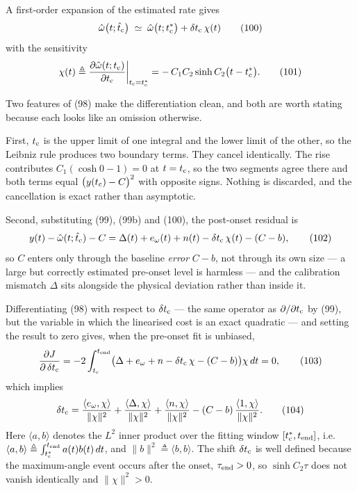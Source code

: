 \documentclass[10pt]{article}
\newcommand{\tc}{t_{\rm c}}
\newcommand{\tcs}{t_{\rm c}^{*}}
\newcommand{\tend}{t_{\rm end}}
\begin{document}
A first-order expansion of the estimated rate gives
\begin{equation}
  \hat\omega\bigl(t;\hat\tc\bigr)
  \;\simeq\; \hat\omega\bigl(t;\tcs\bigr) + \delta\tc\,\chi(t)
  \tag{100}
\end{equation}
with the sensitivity
\begin{equation}
  \chi(t) \triangleq
  \frac{\partial\hat\omega(t;\tc)}{\partial \tc}\bigg|_{\tc = \tcs}
  = -\,C_1C_2\sinh C_2\bigl(t - \tcs\bigr).
  \tag{101}
\end{equation}

Two features of (98) make the differentiation clean, and both are worth
stating because each looks like an omission otherwise.

First, $\tc$ is the upper limit of one integral and the lower limit of
the other, so the Leibniz rule produces two boundary terms. They cancel
identically. The rise contributes $C_1(\cosh 0 - 1) = 0$ at $t = \tc$,
so the two segments agree there and both terms equal
$\bigl(y(\tc) - C\bigr)^2$ with opposite signs. Nothing is discarded,
and the cancellation is exact rather than asymptotic.

Second, substituting (99), (99b) and (100), the post-onset residual is
\begin{equation}
  y(t) - \hat\omega(t;\hat\tc) - C
  = \Delta(t) + e_\omega(t) + n(t) - \delta\tc\,\chi(t) - (C - b),
  \tag{102}
\end{equation}
so $C$ enters only through the baseline \emph{error} $C - b$, not
through its own size --- a large but correctly estimated pre-onset level
is harmless --- and the calibration mismatch $\Delta$ sits alongside the
physical deviation rather than inside it.

Differentiating (98) with respect to $\delta\tc$ --- the same operator
as $\partial/\partial\tc$ by (99), but the variable in which the
linearised cost is an exact quadratic --- and setting the result to zero
gives, when the pre-onset fit is unbiased,
\begin{equation}
  \frac{\partial J}{\partial\,\delta\tc}
  = -2\int_{\tc}^{\tend}\bigl(\Delta + e_\omega + n
      - \delta\tc\,\chi - (C-b)\bigr)\chi\,dt = 0 ,
  \tag{103}
\end{equation}
which implies
\begin{equation}
  \delta\tc
  = \frac{\langle e_\omega,\chi\rangle}{\|\chi\|^{2}}
  + \frac{\langle \Delta,\chi\rangle}{\|\chi\|^{2}}
  + \frac{\langle n,\chi\rangle}{\|\chi\|^{2}}
  - (C - b)\,\frac{\langle 1,\chi\rangle}{\|\chi\|^{2}} .
  \tag{104}
\end{equation}
Here $\langle a,b\rangle$ denotes the $L^2$ inner product over the
fitting window $[\tcs,\tend]$, i.e.\ $\langle a,b\rangle \triangleq
\int_{\tcs}^{\tend}a(t)b(t)\,dt$, and $\|b\|^2 \triangleq \langle
b,b\rangle$. The shift $\delta\tc$ is well defined because the
maximum-angle event occurs after the onset, $\tau_{\rm end} > 0$, so
$\sinh C_2\tau$ does not vanish identically and $\|\chi\|^2 > 0$.
\end{document}
